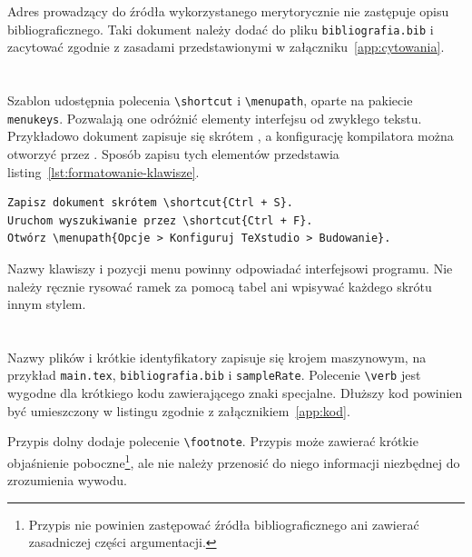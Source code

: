 Adres prowadzący do źródła wykorzystanego merytorycznie nie zastępuje opisu bibliograficznego. Taki dokument należy dodać do pliku \texttt{bibliografia.bib} i zacytować zgodnie z zasadami przedstawionymi w załączniku~\ref{app:cytowania}.

\section{}

Szablon udostępnia polecenia \verb|\shortcut| i \verb|\menupath|, oparte na pakiecie \texttt{menukeys}. Pozwalają one odróżnić elementy interfejsu od zwykłego tekstu. Przykładowo dokument zapisuje się skrótem , a konfigurację kompilatora można otworzyć przez . Sposób zapisu tych elementów przedstawia listing~\ref{lst:formatowanie-klawisze}.

\begin{lstlisting}[style=thesis,caption={Skróty klawiszowe i ścieżki menu},label={lst:formatowanie-klawisze}]
Zapisz dokument skrótem \shortcut{Ctrl + S}.
Uruchom wyszukiwanie przez \shortcut{Ctrl + F}.
Otwórz \menupath{Opcje > Konfiguruj TeXstudio > Budowanie}.
\end{lstlisting}

Nazwy klawiszy i pozycji menu powinny odpowiadać interfejsowi programu. Nie należy ręcznie rysować ramek za pomocą tabel ani wpisywać każdego skrótu innym stylem.

\section{}

Nazwy plików i krótkie identyfikatory zapisuje się krojem maszynowym, na przykład \texttt{main.tex}, \texttt{bibliografia.bib} i \texttt{sampleRate}. Polecenie \verb|\verb| jest wygodne dla krótkiego kodu zawierającego znaki specjalne. Dłuższy kod powinien być umieszczony w listingu zgodnie z załącznikiem~\ref{app:kod}.

Przypis dolny dodaje polecenie \verb|\footnote|. Przypis może zawierać krótkie objaśnienie poboczne\footnote{Przypis nie powinien zastępować źródła bibliograficznego ani zawierać zasadniczej części argumentacji.}, ale nie należy przenosić do niego informacji niezbędnej do zrozumienia wywodu.


